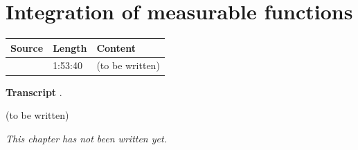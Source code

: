 \chapter{Integration of measurable functions}\label{ch:c26}
\begin{paracol}{2}

\begin{sources}
\begin{tabularx}{\linewidth}{@{}l l L@{}}
\toprule
\textbf{Source} & \textbf{Length} & \textbf{Content}\\
\midrule
{} & 1:53:40 & (to be written)\\
\bottomrule
\end{tabularx}

\smallskip
\textbf{Transcript} .
\end{sources}

\begin{reading}
(to be written)
\end{reading}

\emph{This chapter has not been written yet.}

\flushside
\end{paracol}
